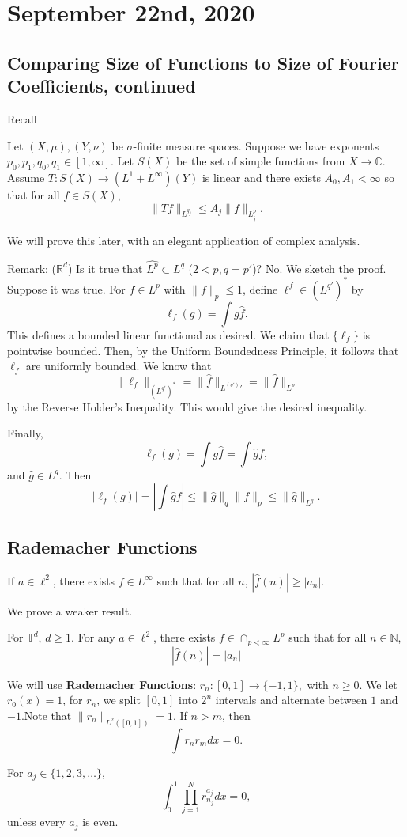 \documentclass[11pt]{scrartcl}
\newcommand{\N}{\mathbb{N}}
\newcommand{\R}{\mathbb{R}}
\newcommand{\C}{\mathbb C}
\newcommand{\T}{\mathbb T}
\let \hat \widehat
\newcommand{\<}{\langle}
\renewcommand{\>}{\rangle}
\begin{document}
\section{September 22nd, 2020}
\subsection{Comparing Size of Functions to Size of Fourier Coefficients, continued}
Recall 
\begin{thm} Let $(X, \mu), (Y, \nu)$ be $\sigma$-finite measure spaces.  Suppose we have exponents $p_0, p_1, q_0, q_1 \in [1, \infty]$.  Let $S(X)$ be the set of simple functions from $X \rightarrow \C$.  Assume $T: S(X) \rightarrow (L^1 + L^{\infty})(Y)$ is linear and there exists $A_0, A_1 < \infty$ so that for all $f \in S(X)$, $$\|Tf\|_{L^{q_j}} \le A_j\|f\|_{L^p_j}.$$
\end{thm}
We will prove this later, with an elegant application of complex analysis.

Remark: ($\R^d$) Is it true that $\hat{L^p} \subset L^q$ ($2 < p, q = p'$)?  No.  We sketch the proof.  Suppose it was true.  For $f \in L^p$ with $\|f\|_p \le 1$, define $\ell^f \in (L^{q'})^*$ by
$$\ell_f(g) = \int g\hat{f}.$$
This defines a bounded linear functional as desired.  We claim that $\{\ell_f\}$ is pointwise bounded.  Then, by the Uniform Boundedness Principle, it follows that $\ell_f$ are uniformly bounded.  We know that 
$$\|\ell_f\|_{(L^{q'})^*} = \|\hat{f}\|_{L^(q')'} = \|\hat{f}\|_{L^p}$$
by the Reverse Holder's Inequality.  This would give the desired inequality.

Finally,
$$\ell_f(g) = \int g\hat{f} = \int \hat{g} f,$$
and $\hat{g} \in L^q$.  Then
$$|\ell_f(g)| = |\int \hat{g}f| \le \|\hat{g}\|_{q} \|f\|_p \le \|\hat{g}\|_{L^q}.$$

\subsection{Rademacher Functions}
\begin{thm}[Kahane] If $a \in \ell^2$, there exists $f \in L^{\infty}$ such that for all $n$, $|\hat{f}(n)| \ge |a_n|$.
\end{thm}
We prove a weaker result.
\begin{thm} For $\T^d$, $d \ge 1$.  For any $a \in \ell^2$, there exists $f \in \cap_{p < \infty} L^p$ such that for all $n \in \N$,  $$|\hat{f}(n)| = |a_n|$$
\end{thm}
We will use \textbf{Rademacher Functions}: $r_n : [0, 1] \rightarrow \{-1,1 \},$ with $n \ge 0$.  We let $r_0(x) = 1$, for $r_n$, we split $[0, 1]$ into $2^n$ intervals and alternate between $1$ and $-1$.Note that $\|r_n\|_{L^2([0, 1])} = 1$.  If $n > m$, then
$$\int r_n r_m dx = 0.$$  
\begin{lemma} For $a_j \in \{1, 2,3, \dots\} $, $$\int_{0}^1 \prod_{j=1}^N r_{n_j}^{a_j}dx = 0,$$
unless every $a_j$ is even.
\end{lemma}
\end{document}
